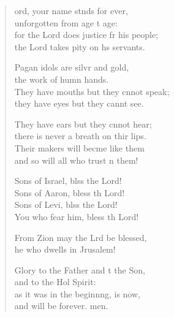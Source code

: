 \settowidth{\versewidth}{for the Lord does justice for his people; *}
\begin{verse}%
  \begin{patverse}
ord, your name stnds for ever,\Med\\
unforgotten from age t age:\\
for the Lord does justice fr his people;\Med\\
the Lord takes pity on h\pointup{\i}s servants.

Pagan idols are silvr and gold,\Med\\
the work of humn hands.\\
They have mouths but they cnnot speak;\Med\\
they have eyes but they cannt see.

They have ears but they cnnot hear;\Med\\
there is never a breath on thir lips.\\
Their makers will becme like them\Med\\
and so will all who trust \pointup{\i}n them!

Sons of Israel, blss the Lord!\Med\\
Sons of Aaron, bless th Lord!\\
Sons of Levi, blss the Lord!\Med\\
You who fear him, bless th Lord!

From Zion may the Lrd be blessed,\Med\\
he who dwells in Jrusalem!

Glory to the Father and t the Son,\Med\\
and to the Hol Spirit:\\
as it was in the beginn\pointup{\i}ng, is now,\Med\\
and will be forever. men.
  \end{patverse}
\end{verse}
